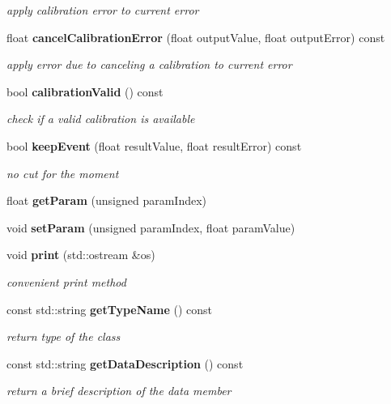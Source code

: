 \begin{DoxyCompactItemize}
\begin{DoxyCompactList}\small\item\em apply calibration error to current error \end{DoxyCompactList}\item 
float {\bf cancel\-Calibration\-Error} (float output\-Value, float output\-Error) const \label{classCALICE_1_1MIPConstants_acf2c408c31f28ed72e2513361ec545c6}

\begin{DoxyCompactList}\small\item\em apply error due to canceling a calibration to current error \end{DoxyCompactList}\item 
bool {\bf calibration\-Valid} () const \label{classCALICE_1_1MIPConstants_aba936e2505ba100025495dded661ccb0}

\begin{DoxyCompactList}\small\item\em check if a valid calibration is available \end{DoxyCompactList}\item 
bool {\bf keep\-Event} (float result\-Value, float result\-Error) const \label{classCALICE_1_1MIPConstants_a11232a43c70405ef3f8c4cc88641de6a}

\begin{DoxyCompactList}\small\item\em no cut for the moment \end{DoxyCompactList}\item 
float {\bfseries get\-Param} (unsigned param\-Index)\label{classCALICE_1_1MIPConstants_a08aee0fbd46dc239bbdba46da0d7c8e5}

\item 
void {\bfseries set\-Param} (unsigned param\-Index, float param\-Value)\label{classCALICE_1_1MIPConstants_a0a107c4475947a8870b1c3735a52531d}

\item 
void {\bf print} (std\-::ostream \&os)\label{classCALICE_1_1MIPConstants_a11a113f9b833cdc4d5e1055459b9e384}

\begin{DoxyCompactList}\small\item\em convenient print method \end{DoxyCompactList}\item 
const std\-::string {\bf get\-Type\-Name} () const \label{classCALICE_1_1MIPConstants_a353fcaec4088c1dcb1e6e76f746654cc}

\begin{DoxyCompactList}\small\item\em return type of the class \end{DoxyCompactList}\item 
const std\-::string {\bf get\-Data\-Description} () const \label{classCALICE_1_1MIPConstants_a9019cd10f06227d6ef9b3b35262741cd}

\begin{DoxyCompactList}\small\item\em return a brief description of the data member \end{DoxyCompactList}\end{DoxyCompactItemize}
